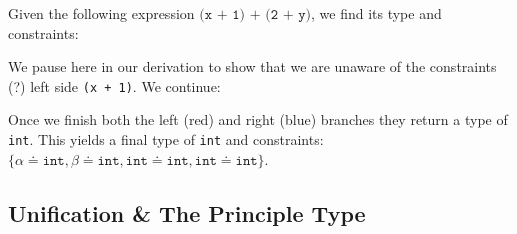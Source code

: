     \begin{Example}

        Given the following expression $\texttt{(x + 1) + (2 + y)}$, we find its type and constraints:\\

        \Large
        \normalsize

        \vspace{1em}
        \noindent
        We pause here in our derivation to show that we are unaware of the constraints (?) left side \texttt{(x + 1)}.
        We continue:\\

        \Large
        \normalsize

        \vspace{1em}
        \noindent
        Once we finish both the left (red) and right (blue) branches they return a type of \texttt{int}. This yields a final type of \texttt{int} and constraints:
        $\{\alpha\doteq\texttt{int}, \beta\doteq\texttt{int}, \texttt{int}\doteq\texttt{int}, \texttt{int}\doteq\texttt{int}\}$.
    \end{Example}
\newpage 
\subsection{Unification \& The Principle Type}


